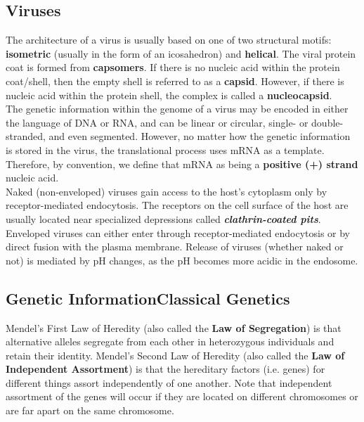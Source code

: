 \documentclass{article}
\theoremstyle{plain}%
\theoremstyle{definition}
\theoremstyle{remark}
\begin{document}
\subsection{Viruses}
The architecture of a virus is usually based on one of two structural motifs: \textbf{isometric} (usually in the form of an icosahedron) and \textbf{helical}. The viral protein coat is formed from \textbf{capsomers}. If there is no nucleic acid within the protein coat/shell, then the empty shell is referred to as a \textbf{capsid}. However, if there is nucleic acid within the protein shell, the complex is called a \textbf{nucleocapsid}.\\
\indent The genetic information within the genome of a virus may be encoded in either the language of DNA or RNA, and can be linear or circular, single- or double- stranded, and even segmented. However, no matter how the genetic information is stored in the virus, the translational process uses mRNA as a template. Therefore, by convention, we define that mRNA as being a \textbf{positive (+) strand} nucleic acid.\\
\indent Naked (non-enveloped) viruses gain access to the host's cytoplasm only by receptor-mediated endocytosis. The receptors on the cell surface of the host are usually located near specialized depressions called \textbf{\textit{clathrin-coated pits}}. Enveloped viruses can either enter through receptor-mediated endocytosis or by direct fusion with the plasma membrane. Release of viruses (whether naked or not) is mediated by pH changes, as the pH becomes more acidic in the endosome. 

\subsection{Genetic Information\textemdash Classical Genetics}
Mendel's First Law of Heredity (also called the \textbf{Law of Segregation}) is that alternative alleles segregate from each other in heterozygous individuals and retain their identity. Mendel's Second Law of Heredity (also called the \textbf{Law of Independent Assortment}) is that the hereditary factors (i.e. genes) for different things assort independently of one another. Note that independent assortment of the genes will occur if they are located on different chromosomes or are far apart on the same chromosome.
\end{document}
